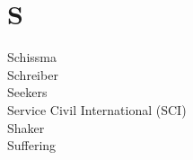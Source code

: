 \section*{S}

\articlesize

\begin{description}
 \item[Schissma]

 \item[Schreiber]

 \item[Seekers]

 \item[Service Civil International (SCI)]

 \item[Shaker]

 \item[Suffering]

 \end{description}

\normalsize
